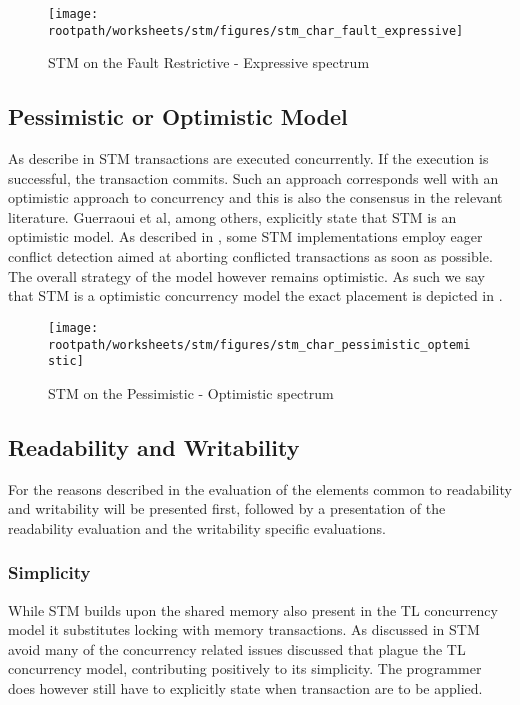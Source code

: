 \begin{figure}[htbp]
\centering
 \texttt{[image: \\rootpath/worksheets/stm/figures/stm\_char\_fault\_expressive]} 
 \caption{\ac{STM} on the Fault Restrictive - Expressive spectrum}
\label{fig:stm_char_fault_expressive}
\end{figure}

\subsection{Pessimistic or Optimistic Model}
As describe in  \ac{STM} transactions are executed concurrently. If the execution is successful, the transaction commits. Such an approach corresponds well with an optimistic approach to concurrency and this is also the consensus in the relevant literature. Guerraoui et al, among others, explicitly state that \ac{STM} is an optimistic model\cite[p. 1]{guerraoui2005toward}. As described in , some \ac{STM} implementations employ eager conflict detection aimed at aborting conflicted transactions as soon as possible. The overall strategy of the model however remains optimistic. As such we say that \ac{STM} is a optimistic concurrency model the exact placement is depicted in .

\begin{figure}[htbp]
\centering
 \texttt{[image: \\rootpath/worksheets/stm/figures/stm\_char\_pessimistic\_optemistic]} 
 \caption{\ac{STM} on the Pessimistic - Optimistic spectrum}
\label{fig:stm_char_pes_opti}
\end{figure}

\subsection{Readability and Writability}
For the reasons described in  the evaluation of the elements common to readability and writability will be presented first, followed by a presentation of the readability evaluation and the writability specific evaluations.

\subsubsection{Simplicity}
\label{subsec:stm_char_simplicity}
While \ac{STM} builds upon the shared memory also present in the \ac{TL} concurrency model it substitutes locking with memory transactions. As discussed in  \ac{STM} avoid many of the concurrency related issues discussed that plague the  \ac{TL} concurrency model, contributing positively to its simplicity. The programmer does however still have to explicitly state when transaction are to be applied.

